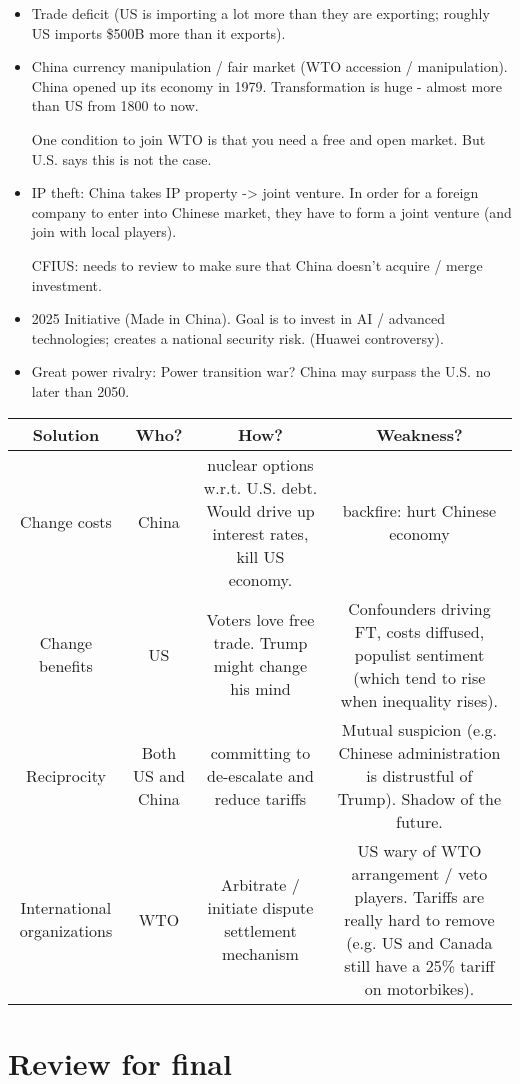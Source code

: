 \documentclass{article}
\begin{document}
\begin{itemize}
  \item Trade deficit (US is importing a lot more than they are exporting; roughly US imports \$500B more than it exports).
  \item China currency manipulation / fair market (WTO accession / manipulation).  China opened up its economy in 1979.  Transformation is huge - almost more than US from 1800 to now.

    One condition to join WTO is that you need a free and open market.  But U.S. says this is not the case.
  \item IP theft: China takes IP property -> joint venture.  In order for a foreign company to enter into Chinese market, they have to form a joint venture (and join with local players).

    CFIUS: needs to review to make sure that China doesn't acquire / merge investment.

  \item 2025 Initiative (Made in China).  Goal is to invest in AI / advanced technologies; creates a national security risk.  (Huawei controversy).
  \item Great power rivalry: Power transition war?  China may surpass the U.S. no later than 2050.
\end{itemize}
\begin{tabular}[h]{|c|c|c|c|}
  \hline
  Solution & Who? & How? & Weakness? \\ \hline
  Change costs & China & nuclear options w.r.t. U.S. debt.  Would drive up interest rates, kill US economy. & backfire: hurt Chinese economy \\ \hline
  Change benefits & US & Voters love free trade.  Trump might change his mind & Confounders driving FT, costs diffused, populist sentiment (which tend to rise when inequality rises).  \\ \hline
  Reciprocity & Both US and China & committing to de-escalate and reduce tariffs & Mutual suspicion (e.g. Chinese administration is distrustful of Trump).  Shadow of the future. \\ \hline
  International organizations & WTO & Arbitrate / initiate dispute settlement mechanism & US wary of WTO arrangement / veto players. Tariffs are really hard to remove (e.g. US and Canada still have a 25\% tariff on motorbikes). \\ \hline
\end{tabular}

\section{Review for final}
\end{document}
